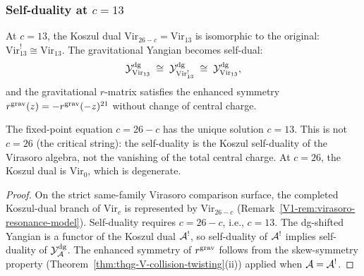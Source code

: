 \subsubsection{Self-duality at $c = 13$}

\begin{proposition}[Self-duality of the gravitational Yangian at
$c = 13$; \ClaimStatusProvedHere]
At $c = 13$, the Koszul dual $\mathrm{Vir}_{26-c} = \mathrm{Vir}_{13}$
is isomorphic to the original: $\mathrm{Vir}_{13}^! \cong
\mathrm{Vir}_{13}$. The gravitational Yangian becomes self-dual:
\begin{equation}%
\Ydg_{\mathrm{Vir}_{13}}
\;\cong\;
\Ydg_{\mathrm{Vir}_{13}^!}
\;\cong\;
\Ydg_{\mathrm{Vir}_{13}},
\end{equation}
and the gravitational $r$-matrix satisfies the enhanced symmetry
$r^{\mathrm{grav}}(z) = -r^{\mathrm{grav}}(-z)^{21}$ without change of central charge.

The fixed-point equation $c = 26 - c$ has the unique solution
$c = 13$. This is not $c = 26$ (the critical string): the
self-duality is the Koszul self-duality of the Virasoro algebra,
not the vanishing of the total central charge. At $c = 26$, the
Koszul dual is $\mathrm{Vir}_0$, which is degenerate.
\end{proposition}

\begin{proof}
On the strict same-family Virasoro comparison surface, the completed
Koszul-dual branch of $\mathrm{Vir}_c$ is represented by
$\mathrm{Vir}_{26-c}$
\textup{(}Remark~\ref{V1-rem:virasoro-resonance-model}\textup{)}.
Self-duality requires $c = 26 - c$, i.e., $c = 13$.
The dg-shifted Yangian is a functor of the Koszul dual
$\mathcal{A}^!$, so self-duality of $\mathcal{A}^!$ implies self-duality of
$\mathcal{Y}^{\mathrm{dg}}_{\mathcal{A}}$. The enhanced symmetry of $r^{\mathrm{grav}}$ follows from the
skew-symmetry property (Theorem~\ref{thm:thqg-V-collision-twisting}(ii))
applied when $\mathcal{A} = \mathcal{A}^!$.
\end{proof}


